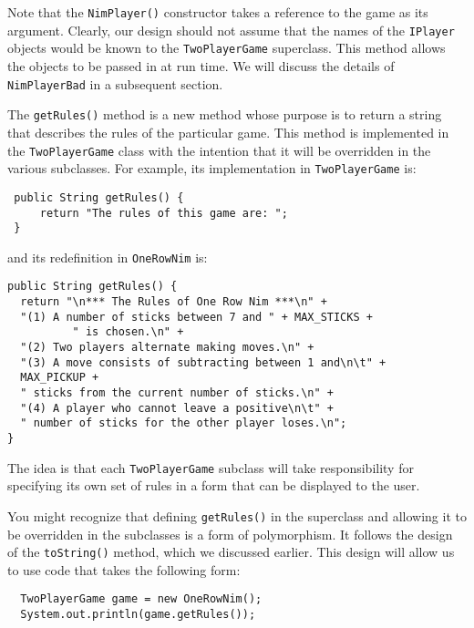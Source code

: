 \noindent Note that the {\tt NimPlayer()} constructor takes a
reference to the game as its argument.  Clearly, our design should not
assume that the names of the {\tt IPlayer} objects would be known to
the {\tt TwoPlayerGame} superclass.  This method allows the objects to
be passed in at run time.  We will discuss the details of {\tt
NimPlayerBad} in a subsequent section.

The {\tt getRules()} method is a new method whose purpose is to return
a string that describes the rules of the particular game. This method
is implemented in the {\tt TwoPlayerGame} class with the intention
that it will be overridden in the various subclasses. For example, its
implementation in {\tt TwoPlayerGame} is:

\begin{jjjlisting}
\begin{lstlisting}
 public String getRules() {
     return "The rules of this game are: ";
 }
\end{lstlisting}
\end{jjjlisting}

\noindent and its redefinition in {\tt OneRowNim} is:

\begin{jjjlisting}
\begin{lstlisting}
public String getRules() {
  return "\n*** The Rules of One Row Nim ***\n" +
  "(1) A number of sticks between 7 and " + MAX_STICKS + 
          " is chosen.\n" + 
  "(2) Two players alternate making moves.\n" + 
  "(3) A move consists of subtracting between 1 and\n\t" + 
  MAX_PICKUP + 
  " sticks from the current number of sticks.\n" + 
  "(4) A player who cannot leave a positive\n\t" + 
  " number of sticks for the other player loses.\n";
}
\end{lstlisting}
\end{jjjlisting}

\noindent The idea is that each {\tt TwoPlayerGame} subclass will take
responsibility for specifying its own set of rules in a form that can
be displayed to the user.  

You might recognize that defining {\tt getRules()} in the superclass
and allowing it to be overridden in the subclasses is a form of
polymorphism. It follows the design of the {\tt toString()} method,
which we discussed earlier.  This design will allow us to use code
that takes the following form:

\begin{jjjlisting}
\begin{lstlisting}
  TwoPlayerGame game = new OneRowNim();
  System.out.println(game.getRules());
\end{lstlisting}
\end{jjjlisting}

